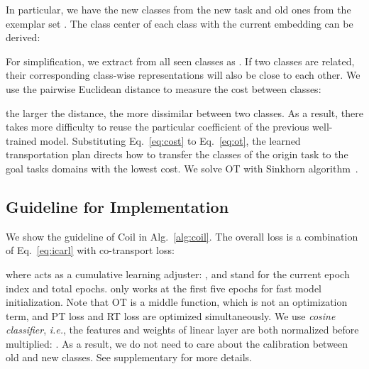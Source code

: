 \documentclass[sigconf]{acmart}
\newcommand{\ie}{\emph{i.e.}}
\newcommand{\name}{{\sc Coil }}
\begin{document}
In particular, we have the new classes from the new task and old ones from the exemplar set . 
The  class center of each class with the current embedding can be derived:

For simplification, we extract from all seen classes as . 
If two classes are related, their corresponding class-wise representations will also be close to each other. We use the pairwise Euclidean distance to measure the cost  between classes:

the larger the distance, the more dissimilar between two classes. As a result, there takes more difficulty to reuse the particular coefficient of the previous well-trained model. Substituting Eq.~\ref{eq:cost} to Eq.~\ref{eq:ot}, the learned transportation plan  directs how to transfer the classes of the origin task to the goal tasks domains with the lowest cost. We solve  OT with Sinkhorn algorithm~\cite{cuturi2013sinkhorn}.







\subsection{Guideline for Implementation} \label{sec:imp}
We show the guideline of \name in Alg.~\ref{alg:coil}. 
The overall loss  is a combination of Eq.~\ref{eq:icarl} with co-transport loss:

where  acts as a cumulative learning adjuster:
,  and  stand for the current epoch index and total  epochs.  only works at the first five epochs for fast model initialization.
Note that OT is a middle function, which is not an optimization term, and PT loss and RT loss are optimized simultaneously.
We use \emph{cosine classifier}, \ie, the features and weights of linear layer are both normalized before multiplied: . As a result, we do not need to care about  the calibration  between old and new classes. 
See supplementary for more details.
\end{document}
